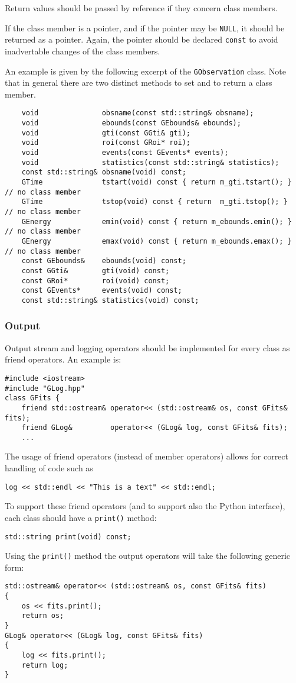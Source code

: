 \documentclass{article}[12pt,a4]
\begin{document}
Return values should be passed by reference if they concern class members.

If the class member is a pointer, and if the pointer may be {\tt NULL}, it should be
returned as a pointer.
Again, the pointer should be declared {\tt const} to avoid inadvertable changes of
the class members.

An example is given by the following excerpt of the {\tt GObservation} class.
Note that in general there are two distinct methods to set and to return a
class member.
\begin{verbatim}
    void               obsname(const std::string& obsname);
    void               ebounds(const GEbounds& ebounds);
    void               gti(const GGti& gti);
    void               roi(const GRoi* roi);
    void               events(const GEvents* events);
    void               statistics(const std::string& statistics);
    const std::string& obsname(void) const;
    GTime              tstart(void) const { return m_gti.tstart(); }  // no class member
    GTime              tstop(void) const { return  m_gti.tstop(); }   // no class member
    GEnergy            emin(void) const { return m_ebounds.emin(); }  // no class member
    GEnergy            emax(void) const { return m_ebounds.emax(); }  // no class member
    const GEbounds&    ebounds(void) const;
    const GGti&        gti(void) const;
    const GRoi*        roi(void) const;
    const GEvents*     events(void) const;
    const std::string& statistics(void) const;
\end{verbatim}


\subsubsection{Output}
\label{sec:output}

Output stream and logging operators should be implemented for every class as friend
operators.
An example is:
\begin{verbatim}
#include <iostream>
#include "GLog.hpp"
class GFits {
    friend std::ostream& operator<< (std::ostream& os, const GFits& fits);
    friend GLog&         operator<< (GLog& log, const GFits& fits);
    ...
\end{verbatim}
The usage of friend operators (instead of member operators) allows for correct handling
of code such as
\begin{verbatim}
log << std::endl << "This is a text" << std::endl;
\end{verbatim}
To support these friend operators (and to support also the Python interface), each class
should have a {\tt print()} method:
\begin{verbatim}
std::string print(void) const;
\end{verbatim}
Using the {\tt print()} method the output operators will take the following generic form:
\begin{verbatim}
std::ostream& operator<< (std::ostream& os, const GFits& fits)
{
    os << fits.print();
    return os;
}
GLog& operator<< (GLog& log, const GFits& fits)
{
    log << fits.print();
    return log;
}
\end{verbatim}
\end{document}
